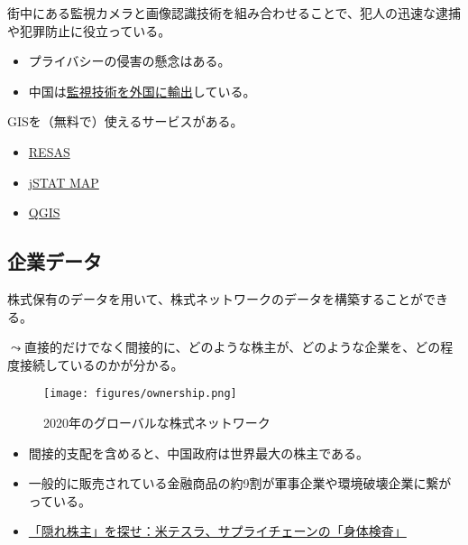 \documentclass[
  xelatex,
  ja=standard]{bxjsarticle}
\providecommand{\tightlist}{%
  \setlength{\itemsep}{0pt}\setlength{\parskip}{0pt}}\usepackage{longtable,booktabs,array}
\begin{document}
街中にある監視カメラと画像認識技術を組み合わせることで、犯人の迅速な逮捕や犯罪防止に役立っている。

\begin{itemize}
\tightlist
\item
  プライバシーの侵害の懸念はある。
\item
  中国は\href{https://www.nikkei.com/article/DGXMZO53393500W9A211C1000000/}{監視技術を外国に輸出}している。
\end{itemize}

GISを（無料で）使えるサービスがある。

\begin{itemize}
\tightlist
\item
  \href{https://resas.go.jp/}{RESAS}
\item
  \href{https://jstatmap.e-stat.go.jp/trialstart.html}{jSTAT MAP}
\item
  \href{https://qgis.org/ja/site/forusers/download.html}{QGIS}
\end{itemize}

\hypertarget{ux4f01ux696dux30c7ux30fcux30bf}{%
\subsection{企業データ}\label{ux4f01ux696dux30c7ux30fcux30bf}}

株式保有のデータを用いて、株式ネットワークのデータを構築することができる。

\(\leadsto\)直接的だけでなく間接的に、どのような株主が、どのような企業を、どの程度接続しているのかが分かる。

\begin{figure}[htpb]

{\centering \texttt{[image: figures/ownership.png]}

}

\caption{2020年のグローバルな株式ネットワーク}

\end{figure}

\begin{itemize}
\tightlist
\item
  間接的支配を含めると、中国政府は世界最大の株主である。
\item
  一般的に販売されている金融商品の約9割が軍事企業や環境破壊企業に繋がっている。
\item
  \href{https://business.nikkei.com/atcl/gen/19/00351/110900058/}{「隠れ株主」を探せ：米テスラ、サプライチェーンの「身体検査」}
\end{itemize}
\end{document}
